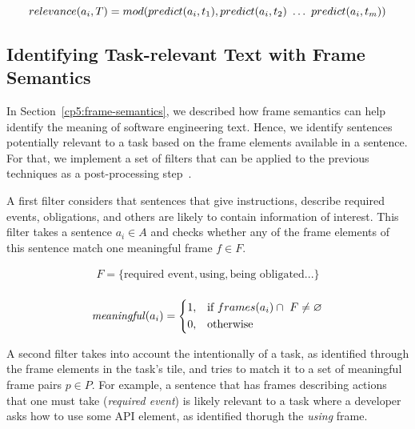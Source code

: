 \begin{equation}
    relevance(a_i, T) = mod(predict(a_i, t_1), predict(a_i, t_2) ~\dots~ predict(a_i, t_m)) \\
\end{equation}





\subsection{Identifying Task-relevant Text with Frame Semantics}
\label{cp5:approach-filters}





In Section~\ref{cp5:frame-semantics}, we described how frame semantics can help identify the meaning of software engineering text. Hence, we identify sentences potentially relevant to a task based on the frame elements available in a sentence. For that, 
 we implement a set of filters that can be applied to the previous techniques as a post-processing step~\cite{Manning2009IR}.

A first filter considers that sentences that give instructions, describe required events, obligations, and others are likely to contain information of interest. This filter takes a sentence $a_i \in A$ and checks whether any of the frame elements of this sentence match one meaningful frame $f \in F$. 




\begin{equation}
\begin{split}
F = \{ \text{required event}, \text{using}, \text{being obligated} ... \} \\
\end{split}
\end{equation}


\begin{equation}
\text{\textit{meaningful}}(a_i) = \left \{
\begin{aligned}
    &1, && \text{if}\ frames(a_i) \cap ~F \ne \emptyset \\
    &0, && \text{otherwise}
\end{aligned} \right.
\end{equation} 


\smallskip
A second filter takes into account the intentionally of a task, as identified through the frame elements in the task's tile, and tries to match it to a set of meaningful frame pairs $p \in P$. For example, a sentence that has frames describing actions that one must take (\textit{required event})  is likely relevant to a task where a developer asks how to use some API element, as identified thorugh the \textit{using} frame.


